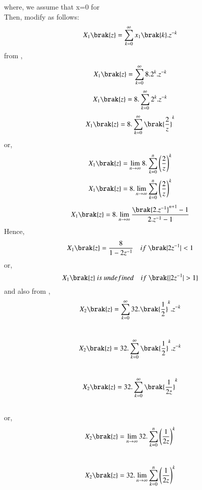 \documentclass[beamer]{IEEEtran}
\theoremstyle{remark}
\begin{document}
where, we assume that x=0   for \\
\brak{\ref{a13}} Then, modify as follows:
\begin{align}
\label{a14}
    X_1\brak{z}=\sum_{k=0}^{\infty} x_1\brak{k}.z^{-k}
\end{align}
from \brak{\ref{a11}},
\begin{align}X_1\brak{z}=\sum_{k=0}^{\infty} 8.2^k.z^{-k}\end{align}
\begin{align}X_1\brak{z}=8.\sum_{k=0}^{\infty} 2^k.z^{-k}\end{align}
\begin{align}X_1\brak{z}=8.\sum_{k=0}^{\infty} \brak{\frac{2}{z}}^k\end{align}
or,
\begin{align}X_1\brak{z}=\lim_{n\to\infty}8.\sum_{k=0}^{n} \left(\frac{2}{z}\right)^k\end{align}
\begin{align}X_1\brak{z}=8.\lim_{n\to\infty}\sum_{k=0}^{n}
\left(\frac{2}{z}\right)^k\end{align}
\begin{align}X_1\brak{z}=8.\lim_{n\to\infty} \frac{\brak{2.z^{-1}}^{n+1}-1}{2.z^{-1}-1}\end{align}
Hence,
\begin{align}
X_1\brak{z}=\frac{8}{1-2z^{-1}}\quad if\ \brak|2z^{-1}|<1
\end{align}
or,
$$X_1\brak{z}\ is\ undefined\quad if\ \brak{|2z^{-1}|>1}$$
and also from \brak{\ref{a12}},\\
\begin{align}X_2\brak{z}=\sum_{k=0}^{\infty} 32.\brak{\frac{1}{2}}^k.z^{-k}\end{align}\\
\begin{align}X_2\brak{z}=32.\sum_{k=0}^{\infty} \brak{\frac{1}{2}}^k.z^{-k}\end{align}\\
\begin{align}X_2\brak{z}=32.\sum_{k=0}^{\infty} \brak{\frac{1}{2z}}^k\end{align}\\
or,\\
\begin{align}X_2\brak{z}=\lim_{n\to\infty}32.\sum_{k=0}^{n} \left(\frac{1}{2z}\right)^k\end{align}\\
\begin{align}X_2\brak{z}=32.\lim_{n\to\infty}\sum_{k=0}^{n}
\left(\frac{1}{2z}\right)^k\end{align}\\
\end{document}

